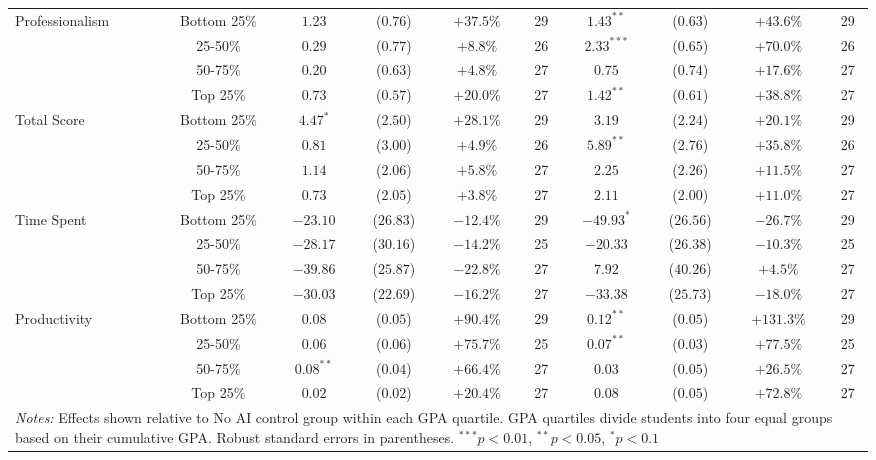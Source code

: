 \begin{table}[!htbp]
\begin{tabular}{lccccccccc}
\hline
\multirow{4}{*}{Professionalism} & Bottom 25\% & $1.23$ & ($0.76$) & $+37.5\%$ & 29 & $1.43^{**}$ & ($0.63$) & $+43.6\%$ & 29 \\
& 25-50\% & $0.29$ & ($0.77$) & $+8.8\%$ & 26 & $2.33^{***}$ & ($0.65$) & $+70.0\%$ & 26 \\
& 50-75\% & $0.20$ & ($0.63$) & $+4.8\%$ & 27 & $0.75$ & ($0.74$) & $+17.6\%$ & 27 \\
& Top 25\% & $0.73$ & ($0.57$) & $+20.0\%$ & 27 & $1.42^{**}$ & ($0.61$) & $+38.8\%$ & 27 \\
\hline
\multirow{4}{*}{Total Score} & Bottom 25\% & $4.47^{*}$ & ($2.50$) & $+28.1\%$ & 29 & $3.19$ & ($2.24$) & $+20.1\%$ & 29 \\
& 25-50\% & $0.81$ & ($3.00$) & $+4.9\%$ & 26 & $5.89^{**}$ & ($2.76$) & $+35.8\%$ & 26 \\
& 50-75\% & $1.14$ & ($2.06$) & $+5.8\%$ & 27 & $2.25$ & ($2.26$) & $+11.5\%$ & 27 \\
& Top 25\% & $0.73$ & ($2.05$) & $+3.8\%$ & 27 & $2.11$ & ($2.00$) & $+11.0\%$ & 27 \\
\hline
\multirow{4}{*}{Time Spent} & Bottom 25\% & $-23.10$ & ($26.83$) & $-12.4\%$ & 29 & $-49.93^{*}$ & ($26.56$) & $-26.7\%$ & 29 \\
& 25-50\% & $-28.17$ & ($30.16$) & $-14.2\%$ & 25 & $-20.33$ & ($26.38$) & $-10.3\%$ & 25 \\
& 50-75\% & $-39.86$ & ($25.87$) & $-22.8\%$ & 27 & $7.92$ & ($40.26$) & $+4.5\%$ & 27 \\
& Top 25\% & $-30.03$ & ($22.69$) & $-16.2\%$ & 27 & $-33.38$ & ($25.73$) & $-18.0\%$ & 27 \\
\hline
\multirow{4}{*}{Productivity} & Bottom 25\% & $0.08$ & ($0.05$) & $+90.4\%$ & 29 & $0.12^{**}$ & ($0.05$) & $+131.3\%$ & 29 \\
& 25-50\% & $0.06$ & ($0.06$) & $+75.7\%$ & 25 & $0.07^{**}$ & ($0.03$) & $+77.5\%$ & 25 \\
& 50-75\% & $0.08^{**}$ & ($0.04$) & $+66.4\%$ & 27 & $0.03$ & ($0.05$) & $+26.5\%$ & 27 \\
& Top 25\% & $0.02$ & ($0.02$) & $+20.4\%$ & 27 & $0.08$ & ($0.05$) & $+72.8\%$ & 27 \\
\hline
\multicolumn{10}{p{0.95\linewidth}}{\footnotesize \textit{Notes:} Effects shown relative to No AI control group within each GPA quartile. GPA quartiles divide students into four equal groups based on their cumulative GPA. Robust standard errors in parentheses. $^{***}p<0.01$, $^{**}p<0.05$, $^{*}p<0.1$}
\end{tabular}
\end{table}
